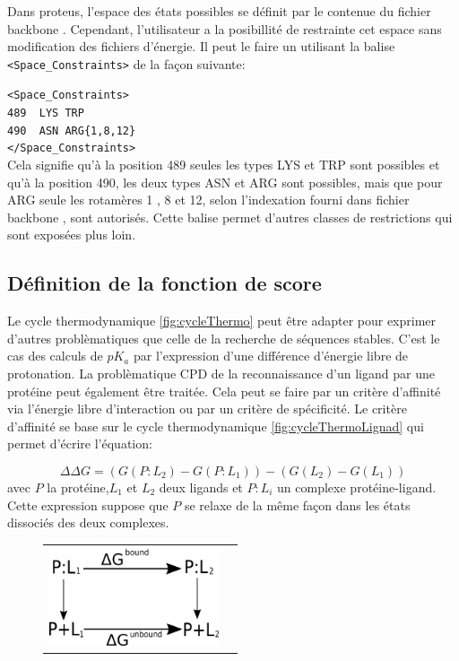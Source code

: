 \begin{enumerate}
Dans proteus, l'espace des états possibles se définit par le contenue du fichier \og backbone \fg. Cependant, l'utilisateur a la posibillité de restrainte cet espace sans modification des fichiers d'énergie. Il peut le faire un utilisant la balise \verb!<Space_Constraints>! de la façon suivante:

\verb!<Space_Constraints>! \\
\verb!489  LYS TRP! \\
\verb!490  ASN ARG{1,8,12}! \\
\verb!</Space_Constraints>! \\

Cela signifie qu'à la position 489 seules les types LYS et TRP sont possibles et qu'à la position 490, les deux types ASN et ARG sont possibles, mais que pour ARG seule les rotamères 1 , 8  et 12, selon l'indexation fourni dans fichier \og backbone \fg, sont autorisés. Cette balise permet d'autres classes de restrictions qui sont exposées plus loin.

 \subsection{Définition de la fonction de score }

 Le cycle thermodynamique \ref{fig:cycleThermo} peut être adapter pour exprimer d'autres problèmatiques que celle de la recherche de séquences stables. C'est le cas des calculs de $pK_a$ par l'expression d'une différence d'énergie libre de protonation. La problèmatique CPD de la reconnaissance d'un ligand par une protéine peut également être traitée. Cela peut se faire par un critère d'affinité via l'énergie libre d'interaction ou par un critère de spécificité. Le critère d'affinité se base sur le cycle thermodynamique  \ref{fig:cycleThermoLignad} qui permet d'écrire l'équation:

 \begin{equation}
   \label{deltaG2}
\Delta \Delta G = (G(P:L_2)- G(P:L_1)) - (G(L_2) - G(L_1))
\end{equation}  
avec $P$ la protéine,$L_1$ et $L_2$ deux ligands et $P:L_i$ un complexe protéine-ligand. 
Cette expression suppose que $P$ se relaxe de la même façon dans les états dissociés des deux complexes. 

   \begin{figure}[!htbp]
     \centering
     \begin{tabular}{cc}
       \includegraphics[width=5cm]{figure/cycleThermoLigand.png} &
     \end{tabular}
     

\end{figure}
\end{enumerate}
